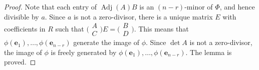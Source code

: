 \documentclass[12pt]{article}
\theoremstyle{definition}
\numberwithin{equation}{theorem}
\newcommand{\bbe}{\mathbf{e}}
\DeclareMathOperator{\Adj}{Adj}
\begin{document}
\begin{proof}
Note that each entry of $\Adj(A)B$ is an $(n-r) $-minor of $\Phi$, and hence divisible by $a$.  Since $a$ is not a zero-divisor, there is a unique matrix $E$ with coefficients in $R$ such that 
$\big(\begin{smallmatrix}
A\\C
\end{smallmatrix}\big)E = \big(
\begin{smallmatrix}
B\\ D
\end{smallmatrix}\big)$. This means that $\phi(\bbe_1), \dots, \phi(\bbe_{n-r})$ generate the image of $\phi$.  Since $\det A$ is not a zero-divisor, the image of $\phi$ is freely generated by $\phi(\bbe_1), \dots, \phi(\bbe_{n-r})$.  The lemma is proved.
\end{proof}
\end{document}
